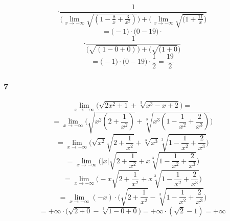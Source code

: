 \documentclass{article}
\begin{document}
\begin{equation*}
    \cdot \frac{1}{\Big(\lim_{x \to -\infty} \sqrt{(1 - \frac{8}{x} + \frac{3}{x^2})}\Big) + \Big(\lim_{x \to -\infty} \sqrt{(1 + \frac{11}{x}}\Big)}
\end{equation*}
\begin{equation*}
    = \Bigg(-1 \Bigg) \cdot \Bigg( 0 - 19 \Bigg) \cdot
\end{equation*}
\begin{equation*}
    \cdot \frac{1}{\Big( \sqrt{(1 - 0 + 0)}\Big) + \Big(\sqrt{(1 + 0}\Big)}
\end{equation*}
\begin{equation*}
    = \Bigg(-1 \Bigg) \cdot \Bigg( 0 - 19 \Bigg) \cdot \frac{1}{2} = \frac{19}{2}
\end{equation*}

\subsubsection*{7}

\begin{equation*}
    \lim_{x \to -\infty} \Bigg(\sqrt{2x^2 + 1} + \sqrt[3]{x^3 - x + 2}\Bigg) = 
\end{equation*}
\begin{equation*}
    = \lim_{x \to -\infty} \Bigg(\sqrt{x^{2}(2 + \frac{1}{x^2})} + \sqrt[3]{x^3(1 - \frac{1}{x^2} + \frac{2}{x^3})}\Bigg) 
\end{equation*}
\begin{equation*}
    = \lim_{x \to -\infty} \Bigg(\sqrt{x^{2}} \sqrt{2 + \frac{1}{x^2}} + \sqrt[3]{x^3} \sqrt[3]{1 - \frac{1}{x^2} + \frac{2}{x^3}}\Bigg) 
\end{equation*}
\begin{equation*}
    = \lim_{x \to -\infty} \Bigg(|x| \sqrt{2 + \frac{1}{x^2}} + x \sqrt[3]{1 - \frac{1}{x^2} + \frac{2}{x^3}}\Bigg) 
\end{equation*}
\begin{equation*}
    = \lim_{x \to -\infty} \Bigg(-x \sqrt{2 + \frac{1}{x^2}} + x \sqrt[3]{1 - \frac{1}{x^2} + \frac{2}{x^3}}\Bigg) 
\end{equation*}
\begin{equation*}
    = \lim_{x \to -\infty} (-x) \cdot \Bigg(\sqrt{2 + \frac{1}{x^2}} - \sqrt[3]{1 - \frac{1}{x^2} + \frac{2}{x^3}}\Bigg) 
\end{equation*}
\begin{equation*}
    = + \infty \cdot \Bigg(\sqrt{2 + 0} - \sqrt[3]{1 - 0 + 0}\Bigg) =  + \infty \cdot (\sqrt{2} - 1) = + \infty
\end{equation*}
\end{document}

